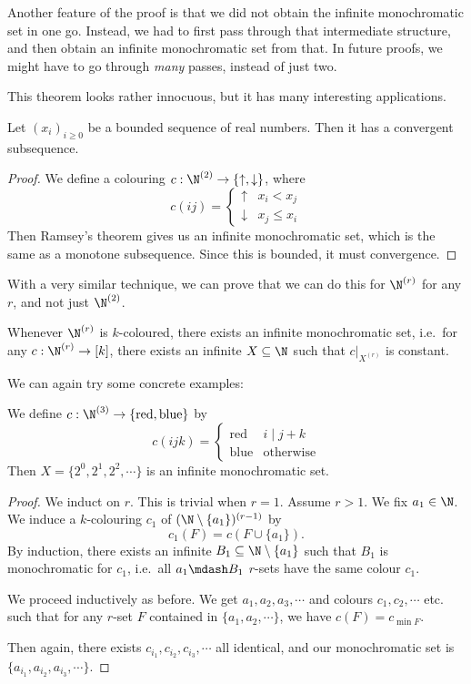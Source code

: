 \documentclass[a4paper]{article}
\begin{document}
Another feature of the proof is that we did not obtain the infinite monochromatic set in one go. Instead, we had to first pass through that intermediate structure, and then obtain an infinite monochromatic set from that. In future proofs, we might have to go through \emph{many} passes, instead of just two.

This theorem looks rather innocuous, but it has many interesting applications.
\begin{cor}
  Let $(x_i)_{i \geq 0}$ be a bounded sequence of real numbers. Then it has a convergent subsequence.
\end{cor}

\begin{proof}
  We define a colouring $c: \N^{(2)} \to \{\uparrow, \downarrow\}$, where
  \[
    c(ij) =
    \begin{cases}
      \uparrow & x_i < x_j\\
      \downarrow & x_j \leq x_i
    \end{cases}
  \]
  Then Ramsey's theorem gives us an infinite monochromatic set, which is the same as a monotone subsequence. Since this is bounded, it must convergence.
\end{proof}

With a very similar technique, we can prove that we can do this for $\N^{(r)}$ for any $r$, and not just $\N^{(2)}$.
\begin{thm}
  Whenever $\N^{(r)}$ is $k$-coloured, there exists an infinite monochromatic set, i.e.\ for any $c: \N^{(r)} \to [k]$, there exists an infinite $X \subseteq \N$ such that $c|_{X^{(r)}}$ is constant.
\end{thm}

We can again try some concrete examples:
\begin{eg}
  We define $c: \N^{(3)} \to \{\mathrm{red}, \mathrm{blue}\}$ by
  \[
    c(ijk) =
    \begin{cases}
      \mathrm{red} & i \mid j + k\\
      \mathrm{blue} & \mathrm{otherwise}
    \end{cases}
  \]
  Then $X = \{2^0, 2^1, 2^2, \cdots\}$ is an infinite monochromatic set.
\end{eg}

\begin{proof}
  We induct on $r$. This is trivial when $r = 1$. Assume $r > 1$. We fix $a_1 \in \N$. We induce a $k$-colouring $c_1$ of $(\N \setminus \{a_1\})^{(r - 1)}$ by
  \[
    c_1(F) = c(F \cup \{a_1\}).
  \]
  By induction, there exists an infinite $B_1 \subseteq \N \setminus \{a_1\}$ such that $B_1$ is monochromatic for $c_1$, i.e.\ all $a_1\mdash B_1$ $r$-sets have the same colour $c_1$.

  We proceed inductively as before. We get $a_1, a_2, a_3, \cdots$ and colours $c_1, c_2, \cdots$ etc. such that for any $r$-set $F$ contained in $\{a_1, a_2, \cdots\}$, we have $c(F) = c_{\min F}$.

  Then again, there exists $c_{i_1}, c_{i_2}, c_{i_3}, \cdots$ all identical, and our monochromatic set is $\{a_{i_1}, a_{i_2}, a_{i_3}, \cdots\}$.
\end{proof}
\end{document}

